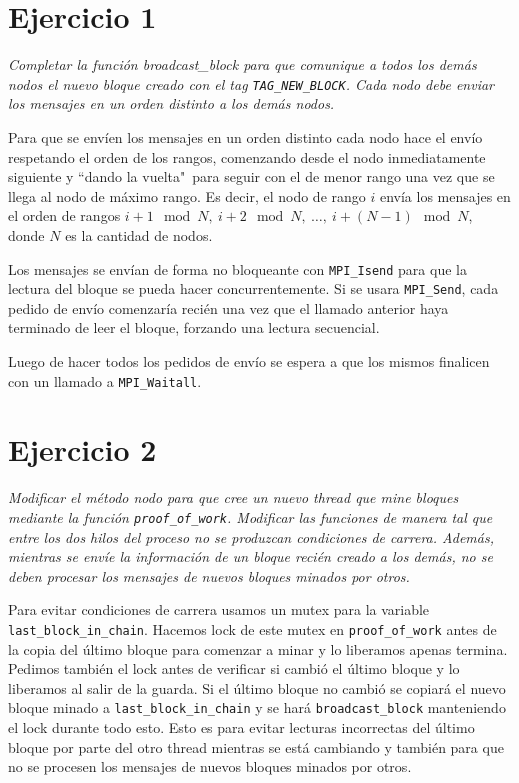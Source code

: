 \section{Ejercicio 1}

\emph{Completar la función broadcast\_block para que comunique a todos los demás nodos el nuevo bloque creado con el tag \texttt{TAG\_NEW\_BLOCK}. Cada nodo debe enviar los mensajes en un orden distinto a los demás nodos.}

Para que se envíen los mensajes en un orden distinto cada nodo hace el envío respetando el orden de los rangos, comenzando desde el nodo inmediatamente siguiente y ``dando la vuelta"\ para seguir con el de menor rango una vez que se llega al nodo de máximo rango. Es decir, el nodo de rango $i$ envía los mensajes en el orden de rangos $i+1 \mod N,\ i+2 \mod N,\ \dots,\ i+(N-1) \mod N$, donde $N$ es la cantidad de nodos.

Los mensajes se envían de forma no bloqueante con \texttt{MPI\_Isend} para que la lectura del bloque se pueda hacer concurrentemente. Si se usara \texttt{MPI\_Send}, cada pedido de envío comenzaría recién una vez que el llamado anterior haya terminado de leer el bloque, forzando una lectura secuencial.

Luego de hacer todos los pedidos de envío se espera a que los mismos finalicen con un llamado a \texttt{MPI\_Waitall}.


\section{Ejercicio 2}

\emph{Modificar el método nodo para que cree un nuevo thread que mine bloques mediante la función \texttt{proof\_of\_work}. Modificar las funciones de manera tal que entre los dos hilos del proceso no se produzcan condiciones de carrera. Además, mientras se envíe la información de un bloque recién creado a los demás, no se deben procesar los mensajes de nuevos bloques minados por otros.}

Para evitar condiciones de carrera usamos un mutex para la variable \texttt{last\_block\_in\_chain}. Hacemos lock de este mutex en \texttt{proof\_of\_work} antes de la copia del último bloque para comenzar a minar y lo liberamos apenas termina. Pedimos también el lock antes de verificar si cambió el último bloque y lo liberamos al salir de la guarda. Si el último bloque no cambió se copiará el nuevo bloque minado a \texttt{last\_block\_in\_chain} y se hará \texttt{broadcast\_block} manteniendo el lock durante todo esto. Esto es para evitar lecturas incorrectas del último bloque por parte del otro thread mientras se está cambiando y también para que no se procesen los mensajes de nuevos bloques minados por otros.

